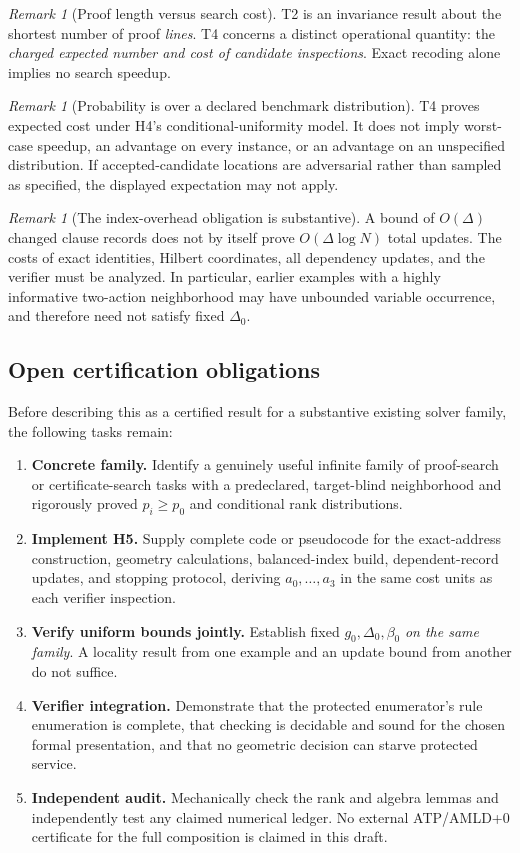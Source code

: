 \documentclass[11pt,letterpaper]{article}
\theoremstyle{definition}
\theoremstyle{remark}
\newtheorem{remark}[theorem]{Remark}
\begin{document}
\begin{remark}[Proof length versus search cost]
T2 is an invariance result about the shortest number of proof \emph{lines}. T4 concerns a distinct operational quantity: the \emph{charged expected number and cost of candidate inspections}. Exact recoding alone implies no search speedup.
\end{remark}

\begin{remark}[Probability is over a declared benchmark distribution]
T4 proves expected cost under H4's conditional-uniformity model. It does not imply worst-case speedup, an advantage on every instance, or an advantage on an unspecified distribution. If accepted-candidate locations are adversarial rather than sampled as specified, the displayed expectation may not apply.
\end{remark}

\begin{remark}[The index-overhead obligation is substantive]
A bound of $O(\Delta)$ changed clause records does not by itself prove $O(\Delta\log N)$ total updates. The costs of exact identities, Hilbert coordinates, all dependency updates, and the verifier must be analyzed. In particular, earlier examples with a highly informative two-action neighborhood may have unbounded variable occurrence, and therefore need not satisfy fixed $\Delta_0$.
\end{remark}

\subsection{Open certification obligations}
Before describing this as a certified result for a substantive existing solver family, the following tasks remain:
\begin{enumerate}[leftmargin=1.8em,itemsep=0.3em]
 \item \textbf{Concrete family.} Identify a genuinely useful infinite family of proof-search or certificate-search tasks with a predeclared, target-blind neighborhood and rigorously proved $p_i\ge p_0$ and conditional rank distributions.
 \item \textbf{Implement H5.} Supply complete code or pseudocode for the exact-address construction, geometry calculations, balanced-index build, dependent-record updates, and stopping protocol, deriving $a_0,\dots,a_3$ in the same cost units as each verifier inspection.
 \item \textbf{Verify uniform bounds jointly.} Establish fixed $g_0,\Delta_0,\beta_0$ \emph{on the same family}. A locality result from one example and an update bound from another do not suffice.
 \item \textbf{Verifier integration.} Demonstrate that the protected enumerator's rule enumeration is complete, that checking is decidable and sound for the chosen formal presentation, and that no geometric decision can starve protected service.
 \item \textbf{Independent audit.} Mechanically check the rank and algebra lemmas and independently test any claimed numerical ledger. No external ATP/AMLD+0 certificate for the full composition is claimed in this draft.
\end{enumerate}
\end{document}
